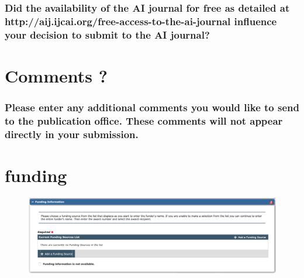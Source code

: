 \documentclass{article}
\begin{document}
\subsubsection*{Did the availability of the AI journal for free as detailed at http://aij.ijcai.org/free-access-to-the-ai-journal influence your decision to submit to the AI journal?}

\section*{Comments ? }
\subsubsection*{ Please enter any additional comments you would like to send to the publication office. These comments will not appear directly in your submission. }

\section*{funding}


\begin{figure}[h!]
    \centering
    \includegraphics[width=\textwidth]{funding}
\end{figure}
\end{document}
